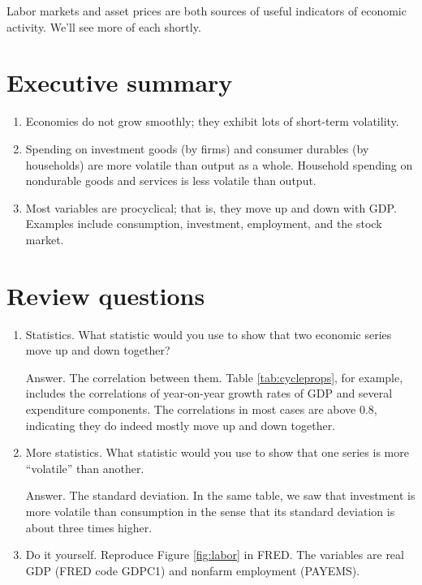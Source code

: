 Labor markets and asset prices are
both sources of useful indicators of economic activity.
We'll see more of each shortly.


\section*{Executive summary}

\setlength{\leftmargini}{.5\oldleftmargini}
\begin{enumerate}
\item Economies do not grow smoothly; they exhibit lots of
short-term volatility.

\item Spending on investment goods (by firms)
and consumer durables (by households) are more volatile
 than output as a whole.
 Household spending on nondurable goods and services
 is less volatile than output.

\item Most variables are procyclical; that is, they move up and down with GDP.
Examples include consumption, investment, employment, and the stock market.
\end{enumerate}
\setlength{\leftmargini}{\oldleftmargini}

\section*{Review questions}

\setlength{\leftmargini}{.5\oldleftmargini}
\begin{enumerate}
\item Statistics.  What statistic would you use to show that two economic series
move up and down together?

Answer.  The correlation between them.
Table \ref{tab:cycleprops}, for example, includes the correlations
of year-on-year growth rates of GDP and several expenditure components.
The correlations in most cases are above 0.8, indicating they do indeed
mostly move up and down together.

\item More statistics.  What statistic would you use
 to show that one series is more ``volatile''
than another.

Answer.  The standard deviation.
In the same table, we saw that investment is more volatile than consumption
in the sense that its standard deviation is about three times higher.

\item Do it yourself.  Reproduce Figure \ref{fig:labor} in FRED.
The variables are real GDP (FRED code GDPC1) and nonfarm employment
(PAYEMS).
\end{enumerate}
\setlength{\leftmargini}{\oldleftmargini}

